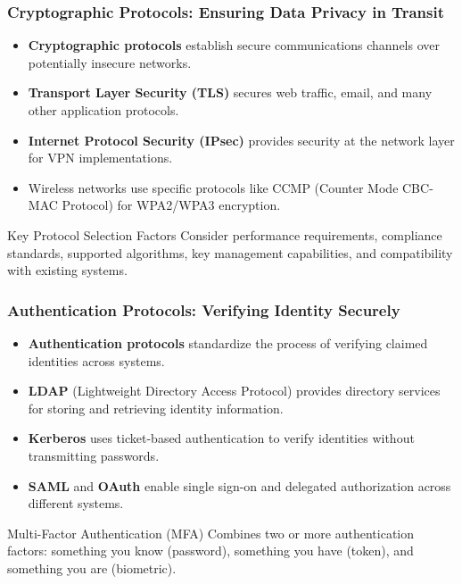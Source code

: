 \documentclass{beamer}
\begin{document}
\begin{frame}
    \frametitle{Cryptographic Protocols: Ensuring Data Privacy in Transit}
    
    \begin{itemize}
        \item \textbf{Cryptographic protocols} establish secure communications channels over potentially insecure networks.
        \item \textbf{Transport Layer Security (TLS)} secures web traffic, email, and many other application protocols.
        \item \textbf{Internet Protocol Security (IPsec)} provides security at the network layer for VPN implementations.
        \item Wireless networks use specific protocols like CCMP (Counter Mode CBC-MAC Protocol) for WPA2/WPA3 encryption.
    \end{itemize}
    
    \begin{exampleblock}{Key Protocol Selection Factors}
        Consider performance requirements, compliance standards, supported algorithms, key management capabilities, and compatibility with existing systems.
    \end{exampleblock}
\end{frame}

\begin{frame}
    \frametitle{Authentication Protocols: Verifying Identity Securely}
    
    \begin{itemize}
        \item \textbf{Authentication protocols} standardize the process of verifying claimed identities across systems.
        \item \textbf{LDAP} (Lightweight Directory Access Protocol) provides directory services for storing and retrieving identity information.
        \item \textbf{Kerberos} uses ticket-based authentication to verify identities without transmitting passwords.
        \item \textbf{SAML} and \textbf{OAuth} enable single sign-on and delegated authorization across different systems.
    \end{itemize}
    
    \begin{block}{Multi-Factor Authentication (MFA)}
        Combines two or more authentication factors: something you know (password), something you have (token), and something you are (biometric).
    \end{block}
\end{frame}
\end{document}
